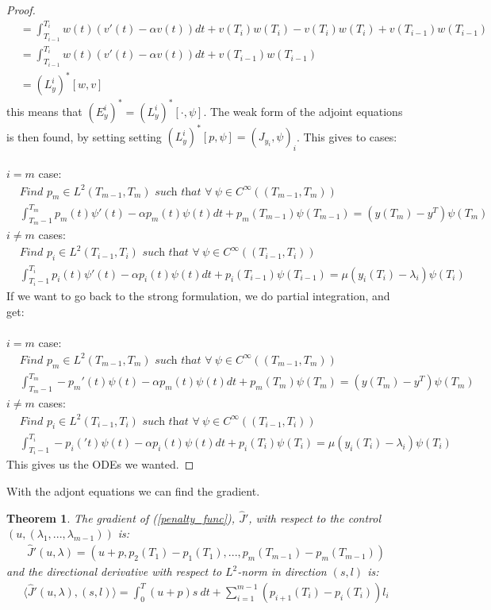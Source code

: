 \documentclass[11pt,a4paper]{article}
\newtheorem{theorem}{Theorem}
\begin{document}
\begin{proof}
\begin{align*}
&=\int_{T_{i-1}}^{T_i}w(t)(v'(t)-\alpha v(t))dt + v(T_i)w(T_i)-v(T_i)w(T_i) +v(T_{i-1})w(T_{i-1}) \\
&=\int_{T_{i-1}}^{T_i}w(t)(v'(t)-\alpha v(t))dt + v(T_{i-1})w(T_{i-1}) \\
&=(L_y^i)^*[w,v]
\end{align*}
this means that $(E_y^i)^*=(L_y^i)^*[\cdot,\psi]$. The weak form of the adjoint equations is then found, by setting setting $(L_y^i)^*[p,\psi]=(J_{y_i},\psi)_i$. This gives to cases:
\\
\\
$i=m$ case:
\begin{align*}
&\textit{Find $p_m \in L^2(T_{m-1},T_m)$ such that }\forall \ \psi \in C^{\infty}((T_{m-1},T_m)) \\
&\int_{T_m-1}^{T_m}p_m(t)\psi'(t)-\alpha p_m(t)\psi(t)dt +p_m(T_{m-1})\psi(T_{m-1})
= (y(T_m)-y^T)\psi(T_m)\ 
\end{align*}
$i\neq m$ cases:
\begin{align*}
&\textit{Find $p_i \in L^2(T_{i-1},T_i)$ such that }\forall \ \psi \in C^{\infty}((T_{i-1},T_i))\\
&\int_{T_i-1}^{T_i}p_i(t)\psi'(t)-\alpha p_i(t)\psi(t)dt +p_i(T_{i-1})\psi(T_{i-1})
= \mu(y_{i}(T_i)-\lambda_i )\psi(T_i) \ 
\end{align*}
If we want to go back to the strong formulation, we do partial integration, and get:
\\
\\
 $i=m$ case:
\begin{align*}
&\textit{Find $p_m \in L^2(T_{m-1},T_m)$ such that }\forall \ \psi \in C^{\infty}((T_{m-1},T_m)) \\
&\int_{T_m-1}^{T_m}-p_m'(t)\psi(t)-\alpha p_m(t)\psi(t)dt +p_m(T_{m})\psi(T_{m})
= (y(T_m)-y^T)\psi(T_m)\ 
\end{align*}
$i\neq m$ cases:
\begin{align*}
&\textit{Find $p_i \in L^2(T_{i-1},T_i)$ such that }\forall \ \psi \in C^{\infty}((T_{i-1},T_i))\\
&\int_{T_i-1}^{T_i}-p_i('t)\psi(t)-\alpha p_i(t)\psi(t)dt +p_i(T_{i})\psi(T_{i})
= \mu(y_{i}(T_i)-\lambda_i )\psi(T_i) \ 
\end{align*}
This gives us the ODEs we wanted.
\end{proof}
With the adjont equations we can find the gradient.
\begin{theorem}
The gradient of (\ref{penalty_func}), $\hat{J}'$, with respect to the control $(u,(\lambda_1,...,\lambda_{m-1}))$ is:
\begin{align*}
\hat{J}'(u,\lambda) = (u+p,p_{2}(T_1) -p_{1}(T_1),..., p_{m}(T_{m-1}) -p_{m}(T_{m-1}))
\end{align*} 
and the directional derivative with respect to $L^2$-norm in direction $(s,l)$ is:
\begin{align*}
\langle \hat{J}'(u,\lambda), (s,l)\rangle = \int_0^T (u+p)s \ dt +\sum_{i=1}^{m-1}(p_{i+1}(T_i) -p_{i}(T_i) )l_i
\end{align*}
\end{theorem}
\end{document}
